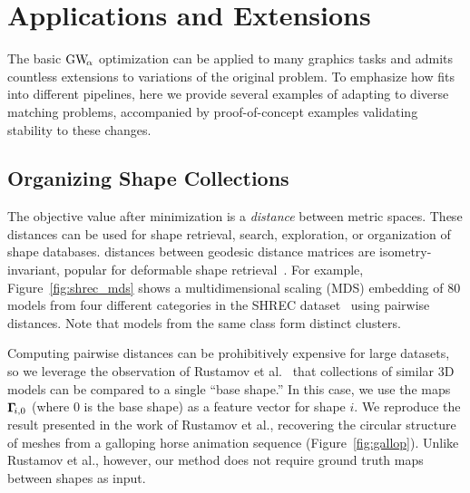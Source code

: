 
\section{Applications and Extensions}

The basic $\GWa$ optimization can be applied to many graphics tasks and admits countless extensions to variations of the original problem.  To emphasize how \GWa fits into different pipelines, here we provide several examples of adapting \GWa to diverse matching problems, accompanied by proof-of-concept examples validating stability to these changes.

\subsection{Organizing Shape Collections}

The \GWa objective value after minimization is a \emph{distance} between metric spaces. These distances can be used for shape retrieval, search, exploration, or organization of shape databases. \GWa distances between geodesic distance matrices are isometry-invariant, popular for deformable shape retrieval~\cite{bronstein-2011,rustamov-2013}. For example, Figure~\ref{fig:shrec_mds} shows a multidimensional scaling (MDS) embedding of 80 models from four different categories in the SHREC dataset~\cite{Giorgi07} using pairwise \GWa distances. Note that models from the same class form distinct clusters.%

Computing pairwise \GWa distances can be prohibitively expensive for large datasets, so we leverage the observation of Rustamov et al.~ that collections of similar 3D models can be compared to a single ``base shape.'' In this case, we use the \GWa maps $\mathbf \Gamma\!_{i,0}$ (where $0$ is the base shape) as a feature vector for shape $i$. We reproduce the result presented in the work of Rustamov et al., recovering the circular structure of meshes from a galloping horse animation sequence (Figure~\ref{fig:gallop}). Unlike Rustamov et al., however, our method does not require ground truth maps between shapes as input. 




